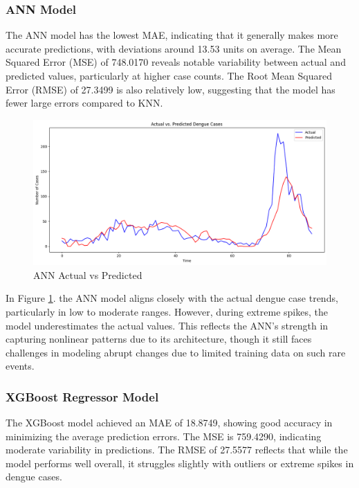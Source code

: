 \documentclass[runningheads]{llncs}
\begin{document}
\subsubsection{ANN Model}
The ANN model has the lowest MAE, indicating that it generally makes more accurate predictions, with deviations around 13.53 units on average. The Mean Squared Error (MSE) of 748.0170 reveals notable variability between actual and predicted values, particularly at higher case counts. The Root Mean Squared Error (RMSE) of 27.3499 is also relatively low, suggesting that the model has fewer large errors compared to KNN.
\begin{figure}[h!]
    \centering
    \includegraphics[width=1\linewidth]{image/Ann plot.png}
    \caption{ANN Actual vs Predicted}
    \label{fig:ann}
\end{figure}

In Figure \ref{fig:ann}. the ANN model aligns closely with the actual dengue case trends, particularly in low to moderate ranges. However, during extreme spikes, the model underestimates the actual values. This reflects the ANN’s strength in capturing nonlinear patterns due to its architecture, though it still faces challenges in modeling abrupt changes due to limited training data on such rare events.

\subsubsection{XGBoost Regressor Model}
The XGBoost model achieved an MAE of 18.8749, showing good accuracy in minimizing the average prediction errors. The MSE is 759.4290, indicating moderate variability in predictions. The RMSE of 27.5577 reflects that while the model performs well overall, it struggles slightly with outliers or extreme spikes in dengue cases.
\end{document}
